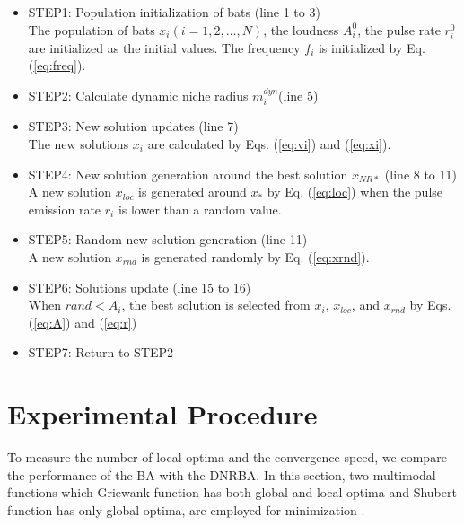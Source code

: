 \begin{itemize}
\item STEP1: Population initialization of bats (line 1 to 3)\\
The population of bats ${x_i}(i=1, 2, ..., N)$, the loudness ${A_i^0}$, the pulse rate ${r_i^0}$ are initialized as the initial values. The frequency ${f_i}$ is initialized by Eq.(\ref{eq:freq}).
\item STEP2: Calculate dynamic niche radius $m_i^{dyn} $(line 5) 
\item STEP3: New solution updates (line 7)\\
The new solutions ${x_i}$ are calculated by Eqs. (\ref{eq:vi}) and (\ref{eq:xi}).
\item STEP4: New solution generation around the best solution ${x_{NR*}}$ (line 8 to 11)\\
A new solution $x_{loc}$ is generated around $x_*$ by Eq. (\ref{eq:loc}) when the pulse emission rate $r_i$ is lower than a random value.
\item STEP5: Random new solution generation (line 11)\\
A new solution ${x_{rnd}}$ is generated randomly by Eq. (\ref{eq:xrnd}).  
\item STEP6: Solutions update (line 15 to 16)\\
When ${rand < A_i}$, the best solution is selected from $x_i$, ${x_{loc}}$, and ${x_{rnd}}$ by Eqs.(\ref{eq:A}) and (\ref{eq:r})
\item STEP7: Return to STEP2 
\end{itemize}


\section{Experimental Procedure}
To measure the number of local optima and the convergence speed, we compare the performance of the BA with the DNRBA. In this section, two multimodal functions which Griewank function has both global and local optima and Shubert function has only global optima, are employed for minimization \cite{f1}\cite{TSC2}.


